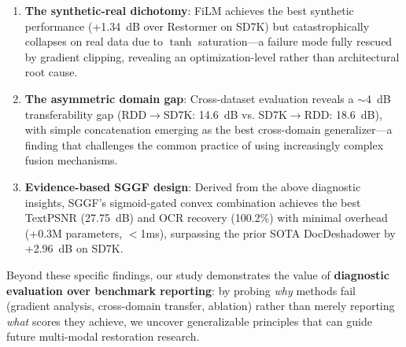 \documentclass[11pt]{article}
\begin{document}
\begin{enumerate}
  \item \textbf{The synthetic-real dichotomy}: FiLM achieves the best synthetic performance (+1.34~dB over Restormer on SD7K) but catastrophically collapses on real data due to $\tanh$ saturation---a failure mode fully rescued by gradient clipping, revealing an optimization-level rather than architectural root cause.
  \item \textbf{The asymmetric domain gap}: Cross-dataset evaluation reveals a $\sim$4~dB transferability gap (RDD$\rightarrow$SD7K: 14.6~dB vs. SD7K$\rightarrow$RDD: 18.6~dB), with simple concatenation emerging as the best cross-domain generalizer---a finding that challenges the common practice of using increasingly complex fusion mechanisms.
  \item \textbf{Evidence-based SGGF design}: Derived from the above diagnostic insights, SGGF's sigmoid-gated convex combination achieves the best TextPSNR (27.75~dB) and OCR recovery (100.2\%) with minimal overhead (+0.3M parameters, $<$1ms), surpassing the prior SOTA DocDeshadower by +2.96~dB on SD7K.
\end{enumerate}

Beyond these specific findings, our study demonstrates the value of \textbf{diagnostic evaluation over benchmark reporting}: by probing \textit{why} methods fail (gradient analysis, cross-domain transfer, ablation) rather than merely reporting \textit{what} scores they achieve, we uncover generalizable principles that can guide future multi-modal restoration research.

\end{document}
